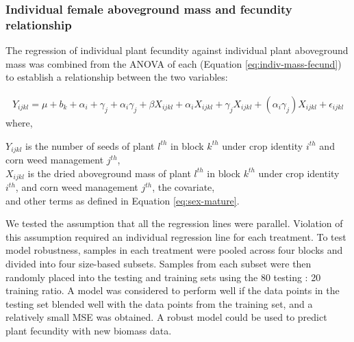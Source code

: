 \documentclass[
]{article}
\begin{document}
\hypertarget{individual-female-aboveground-mass-and-fecundity-relationship}{%
\subsubsection*{Individual female aboveground mass and fecundity relationship}\label{individual-female-aboveground-mass-and-fecundity-relationship}}

The regression of individual plant fecundity against individual plant aboveground mass was combined from the ANOVA of each (Equation \eqref{eq:indiv-mass-fecund}) to establish a relationship between the two variables:

\begin{align} 
Y_{ijkl} = \mu + b_k + \alpha_i + \gamma_j +\alpha_i \gamma_j + \beta X_{ijkl} + \alpha_i X_{ijkl} + \gamma_j X_{ijkl} + (\alpha_i \gamma_j)X_{ijkl} + \epsilon_{ijkl} \label{eq:mass-fecund-anc}
\end{align}
where,

\(Y_{ijkl}\) is the number of seeds of plant \(l^{th}\) in block \(k^{th}\) under crop identity \(i^{th}\) and corn weed management \(j^{th}\),\\
\(X_{ijkl}\) is the dried aboveground mass of plant \(l^{th}\) in block \(k^{th}\) under crop identity \(i^{th}\), and corn weed management \(j^{th}\), the covariate,\\
and other terms as defined in Equation \eqref{eq:sex-mature}.

We tested the assumption that all the regression lines were parallel. Violation of this assumption required an individual regression line for each treatment.
To test model robustness, samples in each treatment were pooled across four blocks and divided into four size-based subsets. Samples from each subset were then randomly placed into the testing and training sets using the 80 testing : 20 training ratio. A model was considered to perform well if the data points in the testing set blended well with the data points from the training set, and a relatively small MSE was obtained. A robust model could be used to predict plant fecundity with new biomass data.
\end{document}
